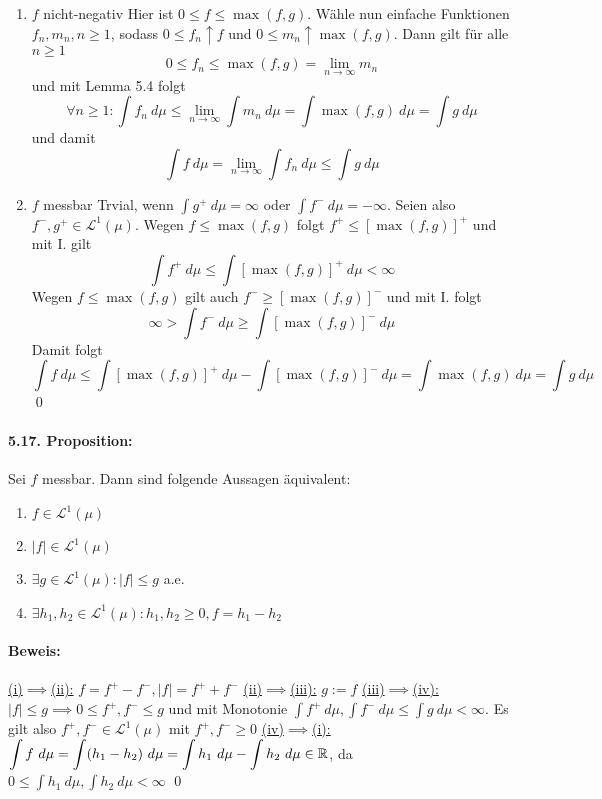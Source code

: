 \documentclass[12pt]{report}
\begin{document}
\begin{enumerate}[label=(\roman*)]
     \begin{enumerate}[label=\Roman*.]
        \item $f$ nicht-negativ\newline
        Hier ist $0\leq f\leq \max(f,g)$. W\"ahle nun einfache Funktionen $f_n,m_n,n\geq1$, sodass $0\leq f_n\uparrow f$ und $0\leq m_n\uparrow\max(f,g)$. Dann gilt f\"ur alle $n\geq1$
        $$0\leq f_n\leq \max(f,g)=\lim_{n\to\infty}m_n$$
        und mit Lemma 5.4 folgt 
        $$\forall n\geq 1:\int f_n\ d\mu\leq\lim_{n\to\infty}\int m_n\ d\mu=\int \max(f,g)\ d\mu=\int g\ d\mu$$
        und damit
        $$\int f\ d\mu=\lim_{n\to\infty}\int f_n\ d\mu\leq\int g\ d\mu$$
        \item $f$ messbar\newline
        Trvial, wenn $\displaystyle\int g^+\ d\mu=\infty$ oder $\displaystyle\int f^-\ d\mu=-\infty$. Seien also $f^-,g^+\in\mathcal{L}^1(\mu)$. Wegen $f\leq\max(f,g)$ folgt $f^+\leq[\max(f,g)]^+$ und mit I. gilt 
        $$\int f^+\ d\mu\leq \int [\max(f,g)]^+\ d\mu<\infty$$
        Wegen $f\leq\max(f,g)$ gilt auch $f^-\geq[\max(f,g)]^-$ und mit I. folgt
        $$\infty>\int f^-\ d\mu\geq\int [\max(f,g)]^-\ d\mu$$
        Damit folgt 
        $$\int f\ d\mu\leq\int [\max(f,g)]^+\ d\mu-\int [\max(f,g)]^-\ d\mu=\int \max(f,g)\ d\mu=\int g\ d\mu$$
        \qed
     \end{enumerate}
 \end{enumerate}
 
 \paragraph{5.17. Proposition:}Sei $f$ messbar. Dann sind folgende Aussagen \"aquivalent:
 \begin{enumerate}[label=(\roman*)]
     \item $f\in\mathcal{L}^1(\mu)$
     \item $|f|\in\mathcal{L}^1(\mu)$
     \item $\exists g\in\mathcal{L}^1(\mu):|f|\leq g$ a.e.
     \item $\exists h_1,h_2\in\mathcal{L}^1(\mu):h_1,h_2\geq0,f=h_1-h_2$
 \end{enumerate}
 
 \paragraph{Beweis:}
 \underline{(i)$\implies$(ii):} $f=f^+-f^-,|f|=f^++f^-$\newline
 \underline{(ii)$\implies$(iii):} $g:=f$ \newline
 \underline{(iii)$\implies$(iv):} $|f|\leq g\implies 0\leq f^+,f^-\leq g$ und mit Monotonie $\displaystyle\int f^+\ d\mu,\int f^-\ d\mu\leq \int g\ d\mu<\infty$. Es gilt also $f^+,f^-\in\mathcal{L}^1(\mu)$ mit $f^+,f^-\geq0$ \newline
 \underline{(iv)$\implies$(i):} $\displaystyle\int f\ d\mu=\int (h_1-h_2)\ d\mu=\int h_1\ d\mu-\int h_2\ d\mu\in\R$, da $0\leq\displaystyle\int h_1\ d\mu,\int h_2\ d\mu<\infty$ \qed
 
\end{document}

